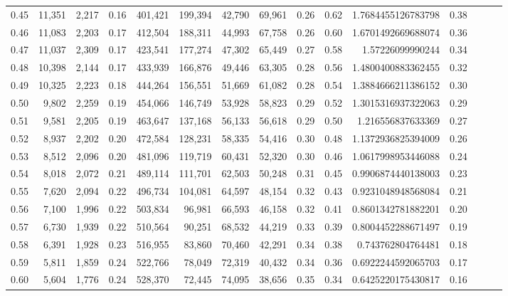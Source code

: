 \begin{tabular}{rrrrrrrrrrrrrrr}
0.45 &  11,351 &  2,217 &  0.16 &  401,421 &  199,394 &   42,790 &   69,961 &  0.26 &  0.62 &    1.7684455126783798 &      0.38 \\
0.46 &  11,083 &  2,203 &  0.17 &  412,504 &  188,311 &   44,993 &   67,758 &  0.26 &  0.60 &    1.6701492669688074 &      0.36 \\
0.47 &  11,037 &  2,309 &  0.17 &  423,541 &  177,274 &   47,302 &   65,449 &  0.27 &  0.58 &      1.57226099990244 &      0.34 \\
0.48 &  10,398 &  2,144 &  0.17 &  433,939 &  166,876 &   49,446 &   63,305 &  0.28 &  0.56 &    1.4800400883362455 &      0.32 \\
0.49 &  10,325 &  2,223 &  0.18 &  444,264 &  156,551 &   51,669 &   61,082 &  0.28 &  0.54 &    1.3884666211386152 &      0.30 \\
0.50 &   9,802 &  2,259 &  0.19 &  454,066 &  146,749 &   53,928 &   58,823 &  0.29 &  0.52 &    1.3015316937322063 &      0.29 \\
0.51 &   9,581 &  2,205 &  0.19 &  463,647 &  137,168 &   56,133 &   56,618 &  0.29 &  0.50 &     1.216556837633369 &      0.27 \\
0.52 &   8,937 &  2,202 &  0.20 &  472,584 &  128,231 &   58,335 &   54,416 &  0.30 &  0.48 &    1.1372936825394009 &      0.26 \\
0.53 &   8,512 &  2,096 &  0.20 &  481,096 &  119,719 &   60,431 &   52,320 &  0.30 &  0.46 &    1.0617998953446088 &      0.24 \\
0.54 &   8,018 &  2,072 &  0.21 &  489,114 &  111,701 &   62,503 &   50,248 &  0.31 &  0.45 &    0.9906874440138003 &      0.23 \\
0.55 &   7,620 &  2,094 &  0.22 &  496,734 &  104,081 &   64,597 &   48,154 &  0.32 &  0.43 &    0.9231048948568084 &      0.21 \\
0.56 &   7,100 &  1,996 &  0.22 &  503,834 &   96,981 &   66,593 &   46,158 &  0.32 &  0.41 &    0.8601342781882201 &      0.20 \\
0.57 &   6,730 &  1,939 &  0.22 &  510,564 &   90,251 &   68,532 &   44,219 &  0.33 &  0.39 &    0.8004452288671497 &      0.19 \\
0.58 &   6,391 &  1,928 &  0.23 &  516,955 &   83,860 &   70,460 &   42,291 &  0.34 &  0.38 &     0.743762804764481 &      0.18 \\
0.59 &   5,811 &  1,859 &  0.24 &  522,766 &   78,049 &   72,319 &   40,432 &  0.34 &  0.36 &    0.6922244592065703 &      0.17 \\
0.60 &   5,604 &  1,776 &  0.24 &  528,370 &   72,445 &   74,095 &   38,656 &  0.35 &  0.34 &    0.6425220175430817 &      0.16 \\

\end{tabular}
